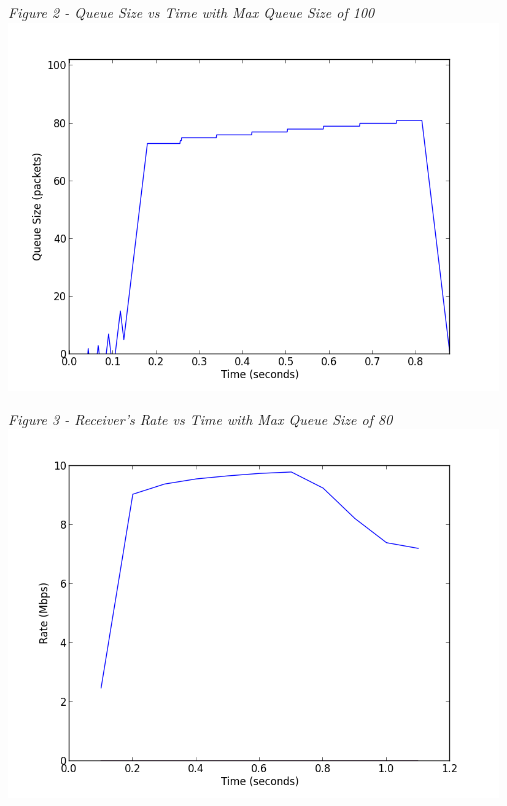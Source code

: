 \documentclass[11pt]{article}
\begin{document}
\textit{Figure 2 - Queue Size vs Time with Max Queue Size of 100}
\\
\includegraphics[width=13cm]{1_data/1-queue_q100}
\vspace{0.25cm}

\textit{Figure 3 - Receiver's Rate vs Time with Max Queue Size of 80}
\\
\includegraphics[width=13cm]{1_data/1-rate_q80}
\vspace{0.25cm}
\end{document}
